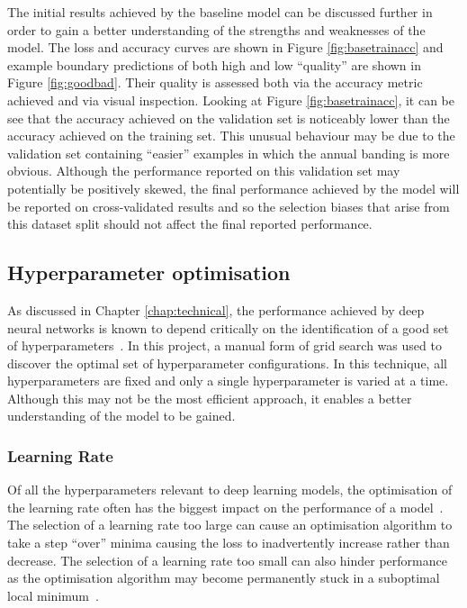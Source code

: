 The initial results achieved by the baseline model can be discussed further in order to gain a better understanding of the strengths and weaknesses of the model. The loss and accuracy curves are shown in Figure \ref{fig:basetrainacc} and example boundary predictions of both high and low ``quality'' are shown in Figure \ref{fig:goodbad}. Their quality is assessed both via the accuracy metric achieved and via visual inspection. Looking at Figure \ref{fig:basetrainacc}, it can be see that the accuracy achieved on the validation set is noticeably lower than the accuracy achieved on the training set. This unusual behaviour may be due to the validation set containing ``easier'' examples in which the annual banding is more obvious. Although the performance reported on this validation set may potentially be positively skewed, the final performance achieved by the model will be reported on cross-validated results and so the selection biases that arise from this dataset split should not affect the final reported performance.

\subsection{Hyperparameter optimisation}

As discussed in Chapter \ref{chap:technical}, the performance achieved by deep neural networks is known to depend critically on the identification of a good set of hyperparameters~\cite{hyperparam, goodhyperparam}. In this project, a manual form of grid search was used to discover the optimal set of hyperparameter configurations. In this technique, all hyperparameters are fixed and only a single hyperparameter is varied at a time. Although this may not be the most efficient approach, it enables a better understanding of the model to be gained.


\subsubsection{Learning Rate}

Of all the hyperparameters relevant to deep learning models, the optimisation of the learning rate often has the biggest impact on the performance of a model~\cite{bengio2012practical}. The selection of a learning rate too large can cause an optimisation algorithm to take a step ``over'' minima causing the loss to inadvertently increase rather than decrease. The selection of a learning rate too small can also hinder performance as the optimisation algorithm may become permanently stuck in a suboptimal local minimum~\cite{goodfellow}.

